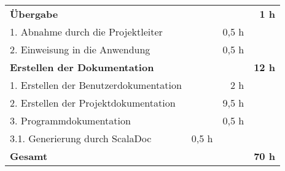\begin{tabularx}{\textwidth}{Xrrr}
\rowcolor{heading}\textbf{Übergabe} &	\textbf{}	& \textbf{}	&	\textbf{1 h} \\
1. Abnahme durch die Projektleiter	&		&		0,5 h	&	\\
\rowcolor{odd}2. Einweisung in die Anwendung		&		&		0,5 h	& \\

\rowcolor{heading}\textbf{Erstellen der Dokumentation} & \textbf{} & \textbf{} & \textbf{12 h} \\
1. Erstellen der Benutzerdokumentation &       & 2 h   &  \\
\rowcolor{odd}2. Erstellen der Projektdokumentation &       & 9,5 h   &  \\
3. Programmdokumentation &       & 0,5 h   &  \\
\rowcolor{odd}3.1. Generierung durch ScalaDoc & 0,5 h   &       &  \\
\hline
\hline
\rowcolor{heading}\textbf{Gesamt} & \textbf{} & \textbf{} & \textbf{70 h} \\
\end{tabularx}
